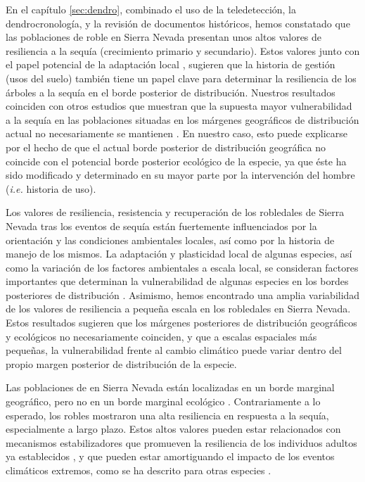 En el capítulo \ref{sec:dendro}, combinado el uso de la teledetección, la dendrocronología, y la revisión de documentos históricos, hemos constatado que las poblaciones de roble en Sierra Nevada presentan unos altos valores de resiliencia a la sequía (crecimiento primario y secundario). Estos valores junto con el papel potencial de la adaptación local \autocite[\emph{e.g.} altos valores de resiliencia genética para los robledales de Sierra Nevada, ][]{ValbuenaCarabanaGil2013GeneticResilience}, sugieren que la historia de gestión (usos del suelo) también tiene un papel clave para determinar la resiliencia de los árboles a la sequía en el borde posterior de distribución. Nuestros resultados coinciden con otros estudios que muestran que la supuesta mayor vulnerabilidad a la sequía en las poblaciones situadas en los márgenes geográficos de distribución actual no necesariamente se mantienen  \autocite[\emph{e.g.}][]{CavinJump2017HighestDrought}. En nuestro caso, esto puede explicarse por el hecho de que el actual borde posterior de distribución geográfica no coincide con el potencial borde posterior ecológico de la especie, ya que éste ha sido modificado y determinado en su mayor parte por la intervención del hombre (\emph{i.e.} historia de uso). 

Los valores de resiliencia, resistencia y recuperación de los robledales de Sierra Nevada tras los eventos de sequía están fuertemente influenciados por la orientación y las condiciones ambientales locales, así como por la historia de manejo de los mismos. La adaptación y plasticidad local de algunas especies, así como la variación de los factores ambientales a escala local, se consideran factores importantes que determinan la vulnerabilidad de algunas especies en los bordes posteriores de distribución \autocites{MartinezVilalta2018RearWindow}. Asimismo, hemos encontrado una amplia variabilidad de los valores de resiliencia a pequeña escala en los robledales en Sierra Nevada. Estos resultados sugieren que los márgenes posteriores de distribución geográficos y ecológicos no necesariamente coinciden, y que a escalas espaciales más pequeñas, la vulnerabilidad frente al cambio climático puede variar dentro del propio margen posterior de distribución de la especie. 

Las poblaciones de \Qp en Sierra Nevada están localizadas en un borde marginal geográfico, pero no en un borde marginal ecológico \autocites[\emph{sensu}][]{MartinezVilalta2018RearWindow,VilaCabreraetal2019RefiningPredictions}. Contrariamente a lo esperado, los robles mostraron una alta resiliencia en respuesta a la sequía, especialmente a largo plazo. Estos altos valores pueden estar relacionados con mecanismos estabilizadores que promueven la resiliencia de los individuos adultos ya establecidos \autocite[\emph{e.g.} capacidad de tolerancia al estrés vinculada a la adaptación local][]{Lloretetal2012ExtremeClimatic}, y que pueden estar amortiguando el impacto de los eventos climáticos extremos, como se ha descrito para otras especies \autocite[\emph{e.}{Pinus sylvestris},][]{HerreroZamora2014PlantResponses}. 

